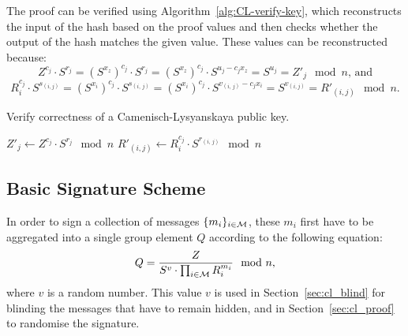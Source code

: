 The proof can be verified using Algorithm~\ref{alg:CL-verify-key}, which
reconstructs the input of the hash based on the proof values and then checks
whether the output of the hash matches the given value. These values can be
reconstructed because:
\begin{equation*}
  Z^{c_j} \cdot S^{r_j}
  = (S^{x_z})^{c_j} \cdot S^{r_j}
  = (S^{x_z})^{c_j} \cdot S^{u_j - c_j x_z}
  = S^{u_j}
  = Z'_j \mod n \text{, and}
\end{equation*}
\begin{equation*}
  R_i^{c_j} \cdot S^{s_{(i,j)}}
  = (S^{x_i})^{c_j} \cdot S^{s_{(i,\, j)}}
  = (S^{x_i})^{c_j} \cdot S^{v_{(i,\, j)}-c_j x_i}
  = S^{v_{(i,j)}}
  = R'_{(i,j)} \mod n \text{.}
\end{equation*}

\begin{algorithm}
  \caption{Verify correctness of a Camenisch-Lysyanskaya public key.}
  \label{alg:CL-verify-key}
  \addtolength{\baselineskip}{1mm}
  \begin{algorithmic}[1]
        \State $Z'_j \gets Z^{c_j} \cdot S^{r_j} \mod n$
          \State $R'_{(i,j)} \gets R_i^{c_j} \cdot S^{r_{(i,\, j)}} \mod n$
        \EndFor
      \EndFor

        \Return {}
      \EndIf

      \Return {}
    \EndFunction
  \end{algorithmic}
\end{algorithm}

\subsection{Basic Signature Scheme}\label{sec:cl_basic}
In order to sign a collection of messages $\{m_i\}_{i \in \mathcal{M}}$, these $m_i$
first have to be aggregated into a single group element $Q$ according
to the following equation:
\begin{equation}\label{eqn:CL-aggregate}
  Q = \dfrac{Z}{S^v \cdot \prod_{i \in \mathcal{M}} R_i^{m_i}} \mod n\text,
\end{equation}
where $v$ is a random number. This value $v$ is used in
Section~\ref{sec:cl_blind} for blinding the messages that have to remain hidden,
and in Section~\ref{sec:cl_proof} to randomise the signature.

